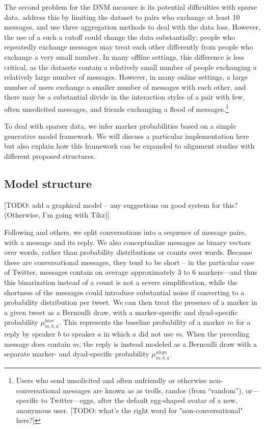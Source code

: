 \documentclass{acm_proc_article-sp}
\begin{document}
The second problem for the DNM measure is its potential difficulties with sparse data. \cite{DNMEtAl2012} address this by limiting the dataset to pairs who exchange at least 10 messages, and use three aggregation methods to deal with the data loss. However, the use of a such a cutoff could change the data substantially; people who repeatedly exchange messages may treat each other differently from people who exchange a very small number. In many offline settings, this difference is less critical, as the datasets contain a relatively small number of people exchanging a relatively large number of messages.  However, in many online settings, a large number of users exchange a smaller number of messages with each other, and there may be a substantial divide in the interaction styles of a pair with few, often unsolicited messages, and friends exchanging a flood of messages.\footnote{Users who send unsolicited and often unfriendly or otherwise non-conversational messages are known as  as trolls, randos (from ``random''), or---specific to Twitter---eggs, after the default egg-shaped avatar of a new, anonymous user. [TODO: what's the right word for "non-conversational" here?]}

To deal with sparser data, we infer marker probabilities based on a simple generative model framework.  We will discuss a particular implementation here but also explain how this framework can be expanded to alignment studies with different proposed structures. 

\subsection{Model structure}
[TODO: add a graphical model -- any suggestions on good system for this? (Otherwise, I'm going with Tikz)]

Following \cite{DNMGamonDumais2011} and others, we split conversations into a sequence of message pairs, with a message and its reply. We also conceptualize messages as binary vectors over words, rather than probability distributions or counts over words.  Because these are conversational messages, they tend to be short -- in the particular case of Twitter, messages contain on average approximately 3 to 6 markers---and thus this binarization instead of a count is not a severe simplification, while the shortness of the messages could introduce substantial noise if converting to a probability distribution per tweet.  We can then treat the presence of a marker in a given tweet as a Bernoulli draw, with a marker-specific and dyad-specific probability $\mu^{base}_{m,b,a}$. This represents the baseline probability of a marker $m$ for a reply by speaker $b$ to speaker $a$ in which $a$ did not use $m$.  When the preceding message does contain $m$, the reply is instead modeled as a Bernoulli draw with a separate marker- and dyad-specific probability $\mu^{align}_{m,b,a}$.
\end{document}
